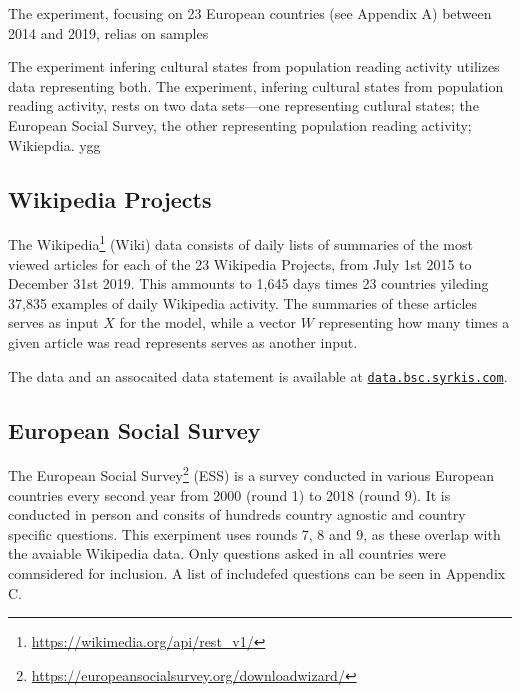 The experiment, focusing on 23 European countries (see Appendix A) between 2014 and 2019, relias on samples


The experiment infering cultural states from population reading activity utilizes data representing both. The experiment, infering cultural states from population reading activity, rests on two data sets—one representing cutlural states; the European Social Survey, the other representing population reading activity; Wikiepdia.
ygg

\subsection*{Wikipedia Projects}

The Wikipedia\footnote{\url{https://wikimedia.org/api/rest_v1/}} (Wiki) data consists of daily lists of summaries of the most viewed articles for each of the 23 Wikipedia Projects, from July 1st 2015 to December 31st 2019.
This ammounts to 1,645 days times 23 countries yileding 37,835 examples of daily Wikipedia activity.
The summaries of these articles serves as input $X$ for the model, while a vector $W$ representing how many times a given article was read represents serves as another input.

The data and an assocaited data statement is available at \href{https://data.bsc.syrkis.com}{\texttt{data.bsc.syrkis.com}}.


\subsection*{European Social Survey}

The European Social Survey\footnote{\url{https://europeansocialsurvey.org/downloadwizard/}} (ESS) is a survey conducted in various European countries every second year from 2000 (round 1) to 2018 (round 9). It is conducted in person and consits of hundreds country agnostic and country specific questions. This exerpiment uses rounds 7, 8 and 9, as these overlap with the avaiable Wikipedia data.
Only questions asked in all countries were comnsidered for inclusion. A list of includefed questions can be seen in Appendix C.


